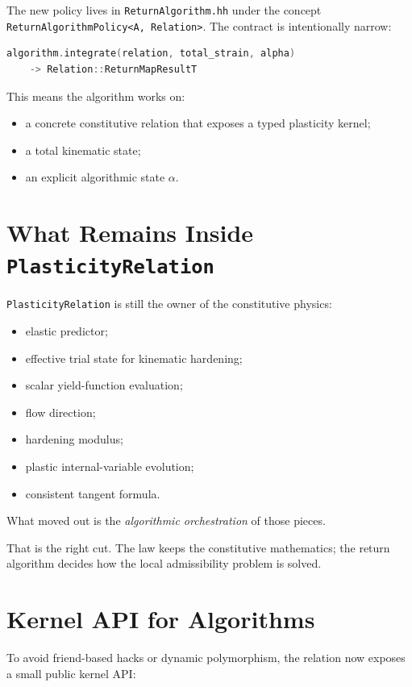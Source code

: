 The new policy lives in \texttt{ReturnAlgorithm.hh} under the concept
\texttt{ReturnAlgorithmPolicy<A, Relation>}.  The contract is intentionally
narrow:

\begin{lstlisting}[language=C++]
algorithm.integrate(relation, total_strain, alpha)
    -> Relation::ReturnMapResultT
\end{lstlisting}

This means the algorithm works on:

\begin{itemize}
  \item a concrete constitutive relation that exposes a typed plasticity
        kernel;
  \item a total kinematic state;
  \item an explicit algorithmic state \(\alpha\).
\end{itemize}

\section{What Remains Inside \texttt{PlasticityRelation}}

\texttt{PlasticityRelation} is still the owner of the constitutive physics:

\begin{itemize}
  \item elastic predictor;
  \item effective trial state for kinematic hardening;
  \item scalar yield-function evaluation;
  \item flow direction;
  \item hardening modulus;
  \item plastic internal-variable evolution;
  \item consistent tangent formula.
\end{itemize}

What moved out is the \emph{algorithmic orchestration} of those pieces.

That is the right cut.  The law keeps the constitutive mathematics; the return
algorithm decides how the local admissibility problem is solved.

\section{Kernel API for Algorithms}

To avoid friend-based hacks or dynamic polymorphism, the relation now exposes a
small public kernel API:

